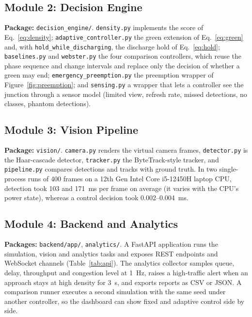 \subsection{Module 2: Decision Engine}
\textbf{Package:} \texttt{decision\_engine/}. \texttt{density.py} implements the score of Eq.~\eqref{eq:density}; \texttt{adaptive\_controller.py} the green extension of Eq.~\eqref{eq:green} and, with \texttt{hold\_while\_discharging}, the discharge hold of Eq.~\eqref{eq:hold}; \texttt{baselines.py} and \texttt{webster.py} the four comparison controllers, which reuse the phase sequence and change intervals and replace only the decision of whether a green may end; \texttt{emergency\_preemption.py} the preemption wrapper of Figure~\ref{fig:preemption}; and \texttt{sensing.py} a wrapper that lets a controller see the junction through a sensor model (limited view, refresh rate, missed detections, no classes, phantom detections).

\subsection{Module 3: Vision Pipeline}
\textbf{Package:} \texttt{vision/}. \texttt{camera.py} renders the virtual camera frames, \texttt{detector.py} is the Haar-cascade detector, \texttt{tracker.py} the ByteTrack-style tracker, and \texttt{pipeline.py} compares detections and tracks with ground truth. In two single-process runs of 400 frames on a 12th Gen Intel Core i5-12450H laptop CPU, detection took 103 and 171~ms per frame on average (it varies with the CPU's power state), whereas a control decision took 0.002--0.004~ms.

\subsection{Module 4: Backend and Analytics}
\textbf{Packages:} \texttt{backend/app/}, \texttt{analytics/}. A FastAPI application runs the simulation, vision and analytics tasks and exposes REST endpoints and WebSocket channels (Table~\ref{tab:api}). The analytics collector samples queue, delay, throughput and congestion level at 1~Hz, raises a high-traffic alert when an approach stays at high density for 3~s, and exports reports as CSV or JSON. A comparison runner executes a second simulation with the same seed under another controller, so the dashboard can show fixed and adaptive control side by side.

